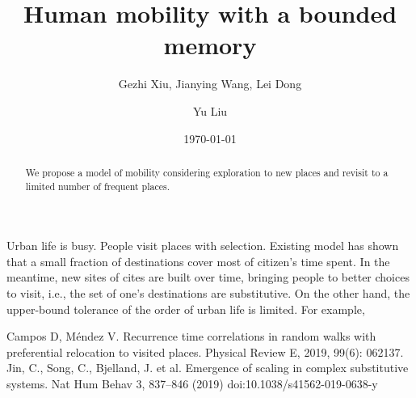 \documentclass[reprint,unsortedaddress,amsmath,amssymb,floatfix,aps,prl,showkeys]{revtex4-2}
\begin{document}
\title{Human mobility with a bounded memory}
\author{Gezhi Xiu, Jianying Wang, Lei Dong}
\author{Yu Liu}
\date{\today}

\begin{abstract}
    We propose a model of mobility considering exploration to new places and revisit to a limited number of frequent places.
\end{abstract}

\maketitle

Urban life is busy. People visit places with selection. Existing model has shown that a small fraction of destinations cover most of citizen's time spent. In the meantime, new sites of cites are built over time, bringing people to better choices to visit, i.e., the set of one's destinations are substitutive\cite{ref2}. On the other hand, the upper-bound tolerance of the order of urban life is limited. For example, 




% 
\begin{thebibliography}{99}  
     Campos D, Méndez V. Recurrence time correlations in random walks with preferential relocation to visited places. Physical Review E, 2019, 99(6): 062137.
     Jin, C., Song, C., Bjelland, J. et al. Emergence of scaling in complex substitutive systems. Nat Hum Behav 3, 837–846 (2019) doi:10.1038/s41562-019-0638-y
\end{thebibliography}
\end{document}
